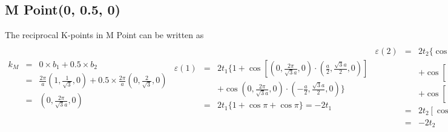 \documentclass[reprint, aps, prb, showkeys]{revtex4-2}
\begin{document}
\subsection{M Point(0, 0.5, 0)}
The reciprocal K-points in M Point can be written as
\begin{subequations}
    \begin{eqnarray}
        k_M &=& 0 \times b_1 + 0.5 \times b_2 \nonumber\\ 
        &=& \frac{2\pi}{a}(1, \frac{1}{\sqrt{3}}, 0) + 0.5 \times \frac{2\pi}{a}(0, \frac{2}{\sqrt{3}}, 0) \nonumber\\
        &=& (0,\frac{2\pi}{\sqrt{3}a}, 0)
    \end{eqnarray}
    \begin{eqnarray}
        \varepsilon(1) &=& 2t_1 \{1 + \cos{[(0,\frac{2\pi}{\sqrt{3}a}, 0) \cdot (\frac{a}{2}, \frac{\sqrt{3}a}{2}, 0)]} \nonumber\\
        &&+ \cos{(0,\frac{2\pi}{\sqrt{3}a}, 0) \cdot (-\frac{a}{2}, \frac{\sqrt{3}a}{2}, 0)} \} \nonumber \\
        &=& 2t_1\{ 1 + \cos{\pi} + \cos{\pi} \} = -2t_1
    \end{eqnarray}
    \begin{eqnarray}
        \varepsilon(2) &=& 2t_2 \{ \cos{[(0,\frac{2\pi}{\sqrt{3}a}, 0) \cdot (\frac{a}{2}, \frac{\sqrt{3}a}{2}, 0)]} \nonumber \\
        &&+ \cos{[(0,\frac{2\pi}{\sqrt{3}a}, 0) \cdot (\frac{a}{2}, -\frac{\sqrt{3}a}{2}, 0)]} \nonumber \\
        &&+ \cos{[(0,\frac{2\pi}{\sqrt{3}a}, 0) \cdot (0, \sqrt{3}a, 0)]} \} \nonumber \\
        &=& 2t_2[\cos{\pi} + \cos{(-\pi)} + \cos{(2\pi)}] \nonumber \\
        &=& -2t_2
    \end{eqnarray}
    \begin{equation}
        \varepsilon = \varepsilon(1) + \varepsilon(2) = -2(t_1 + t_2)
    \end{equation}
\end{subequations}
\end{document}
